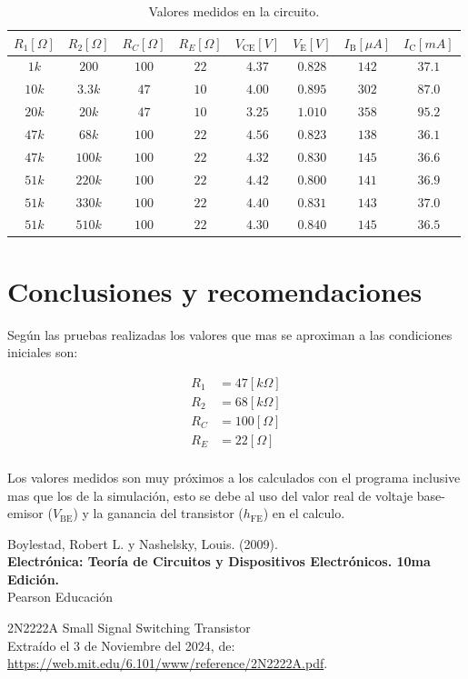 \documentclass[letter,twoside,11pt]{article}
\begin{document}
\begin{table}[!h]
\begin{center}
    \begin{tabular}{|c|c|c|c||c|c|c|c|}
    \hline
    $R_1[\Omega]$ & $R_2[\Omega]$ & $R_C[\Omega]$ & $R_E[\Omega]$ &
    $V_{\text{CE}}[V]$ & $V_{\text{E}}[V]$ &
    $I_{\text{B}}[\mu{A}]$ & $I_{\text{C}}[mA]$
    \tabularnewline \hline
    $ 1k$ & $ 200$ & $100$ & $22$ & $4.37$ & $0.828$ & $142$ & $37.1$ \tabularnewline \hline
    $10k$ & $3.3k$ & $ 47$ & $10$ & $4.00$ & $0.895$ & $302$ & $87.0$ \tabularnewline \hline
    $20k$ & $ 20k$ & $ 47$ & $10$ & $3.25$ & $1.010$ & $358$ & $95.2$ \tabularnewline \hline
    $47k$ & $ 68k$ & $100$ & $22$ & $4.56$ & $0.823$ & $138$ & $36.1$ \tabularnewline \hline
    $47k$ & $100k$ & $100$ & $22$ & $4.32$ & $0.830$ & $145$ & $36.6$ \tabularnewline \hline
    $51k$ & $220k$ & $100$ & $22$ & $4.42$ & $0.800$ & $141$ & $36.9$ \tabularnewline \hline
    $51k$ & $330k$ & $100$ & $22$ & $4.40$ & $0.831$ & $143$ & $37.0$ \tabularnewline \hline
    $51k$ & $510k$ & $100$ & $22$ & $4.30$ & $0.840$ & $145$ & $36.5$ \tabularnewline \hline
    \end{tabular}
\end{center}
\caption{Valores medidos en la circuito.}
\label{armado2}
\end{table}

\section{Conclusiones y recomendaciones}
Según las pruebas realizadas los valores que mas se aproximan a las condiciones
iniciales son:

\begin{equation*}
    \begin{split}
        R_1 &= 47[k\Omega]\\
        R_2 &= 68[k\Omega]\\
        R_C &= 100[\Omega]\\
        R_E &= 22[\Omega]\\
\end{split}
\end{equation*}

Los valores medidos son muy próximos a los calculados con el programa inclusive
mas que los de la simulación, esto se debe al uso del valor real de voltaje
base-emisor ($V_{\text{BE}}$) y la ganancia del transistor ($h_{\text{FE}}$) en
el calculo.

\begin{thebibliography}{99}

Boylestad, Robert L. y Nashelsky, Louis. (2009).\\
\textbf{Electrónica: Teoría de Circuitos y Dispositivos Electrónicos. 10ma Edición.}\\
Pearson Educación

 2N2222A Small Signal Switching Transistor\\
Extraído el 3 de Noviembre del 2024, de: \\
\url{https://web.mit.edu/6.101/www/reference/2N2222A.pdf}.

\end{thebibliography}
\end{document}
